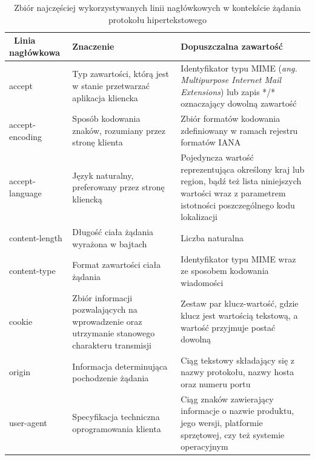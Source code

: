 \begin{table}[htbp] \small
\centering
\caption{Zbiór najczęściej wykorzystywanych linii nagłówkowych w kontekście żądania protokołu hipertekstowego}
\label{tab:naglowki-zadanie}
\begin{tabularx}{\linewidth}{|p{5cm}|X|X|} \hline\
Linia nagłówkowa & Znaczenie & Dopuszczalna zawartość \\ \hline\hline
accept & Typ zawartości, którą jest w stanie przetwarzać aplikacja kliencka & Identyfikator typu MIME (\textit{ang. Multipurpose Internet Mail Extensions}) lub zapis */* oznaczający dowolną zawartość  \\ \hline
accept-encoding & Sposób kodowania znaków, rozumiany przez stronę klienta & Zbiór formatów kodowania zdefiniowany w ramach rejestru formatów IANA\\ \hline
accept-language & Język naturalny, preferowany przez stronę kliencką & Pojedyncza wartość reprezentująca określony kraj lub region, bądź też lista niniejszych wartości wraz z parametrem istotności poszczególnego kodu lokalizacji\\ \hline
content-length & Długość ciała żądania wyrażona w bajtach & Liczba naturalna\\ \hline
content-type & Format zawartości ciała żądania & Identyfikator typu MIME wraz ze sposobem kodowania wiadomości\\ \hline
cookie & Zbiór informacji pozwalających na wprowadzenie oraz utrzymanie stanowego charakteru transmisji & Zestaw par klucz-wartość, gdzie klucz jest wartością tekstową, a wartość przyjmuje postać dowolną\\ \hline
origin & Informacja determinująca pochodzenie żądania & Ciąg tekstowy składający się z nazwy protokołu, nazwy hosta oraz numeru portu\\ \hline
user-agent & Specyfikacja techniczna oprogramowania klienta & Ciąg znaków zawierający informacje o nazwie produktu, jego wersji, platformie sprzętowej, czy też systemie operacyjnym \\ \hline
\end{tabularx}
\end{table}

